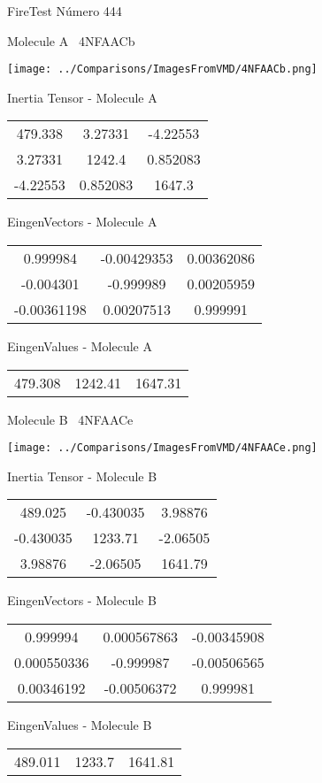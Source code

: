 \vtab[-3cm]
\begin{center}
{\large FireTest \tab Número 444}
\end{center}
\begin{multicols}{2}
\begin{center}

Molecule A \
4NFAACb

\texttt{[image: ../Comparisons/ImagesFromVMD/4NFAACb.png]}

Inertia Tensor - Molecule A \\
\begin{tabular}{|c c c|}
479.338	 & 	3.27331	 & 	-4.22553	 \\
3.27331	 & 	1242.4	 & 	0.852083	 \\
-4.22553	 & 	0.852083	 & 	1647.3
\end{tabular}

\vtab
 EingenVectors - Molecule A     \\
\begin{tabular}{|c c c|}
0.999984	 & 	-0.00429353	 & 	0.00362086	 \\
-0.004301	 & 	-0.999989	 & 	0.00205959	 \\
-0.00361198	 & 	0.00207513	 & 	0.999991
\end{tabular}

\vtab
 EingenValues - Molecule A     \\
\begin{tabular}{|c c c|}
479.308	 & 	1242.41	 & 	1647.31	 \\
\end{tabular}
\columnbreak

Molecule B \
4NFAACe

\texttt{[image: ../Comparisons/ImagesFromVMD/4NFAACe.png]}

Inertia Tensor - Molecule B \\
\begin{tabular}{|c c c|}
489.025	 & 	-0.430035	 & 	3.98876	 \\
-0.430035	 & 	1233.71	 & 	-2.06505	 \\
3.98876	 & 	-2.06505	 & 	1641.79
\end{tabular}

\vtab
 EingenVectors - Molecule B     \\
\begin{tabular}{|c c c|}
0.999994	 & 	0.000567863	 & 	-0.00345908	 \\
0.000550336	 & 	-0.999987	 & 	-0.00506565	 \\
0.00346192	 & 	-0.00506372	 & 	0.999981
\end{tabular}

\vtab
 EingenValues - Molecule B     \\
\begin{tabular}{|c c c|}
489.011	 & 	1233.7	 & 	1641.81	 \\
\end{tabular}

\end{center}
\end{multicols}


